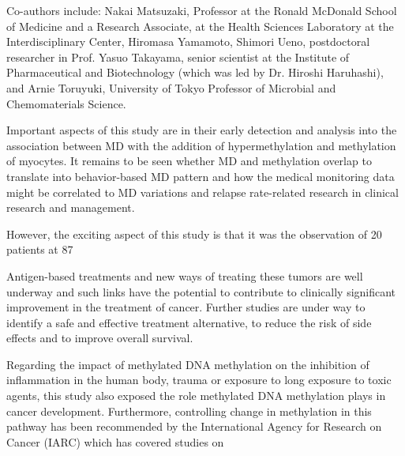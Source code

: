 \documentclass{article}
\begin{document}
Co-authors include: Nakai Matsuzaki, Professor at the Ronald McDonald School of Medicine and a Research Associate, at the Health Sciences Laboratory at the Interdisciplinary Center, Hiromasa Yamamoto, Shimori Ueno, postdoctoral researcher in Prof. Yasuo Takayama, senior scientist at the Institute of Pharmaceutical and Biotechnology (which was led by Dr. Hiroshi Haruhashi), and Arnie Toruyuki, University of Tokyo Professor of Microbial and Chemomaterials Science.

Important aspects of this study are in their early detection and analysis into the association between MD with the addition of hypermethylation and methylation of myocytes. It remains to be seen whether MD and methylation overlap to translate into behavior-based MD pattern and how the medical monitoring data might be correlated to MD variations and relapse rate-related research in clinical research and management.

However, the exciting aspect of this study is that it was the observation of 20 patients at 87%

Antigen-based treatments and new ways of treating these tumors are well underway and such links have the potential to contribute to clinically significant improvement in the treatment of cancer. Further studies are under way to identify a safe and effective treatment alternative, to reduce the risk of side effects and to improve overall survival.

Regarding the impact of methylated DNA methylation on the inhibition of inflammation in the human body, trauma or exposure to long exposure to toxic agents, this study also exposed the role methylated DNA methylation plays in cancer development. Furthermore, controlling change in methylation in this pathway has been recommended by the International Agency for Research on Cancer (IARC) which has covered studies on 
\end{document}
